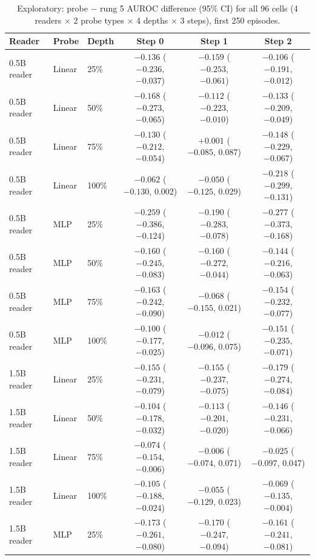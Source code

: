 \documentclass[11pt]{article}
\begin{document}
\begin{table}[h]
\centering\scriptsize
\setlength{\tabcolsep}{3pt}
\caption{Exploratory: probe $-$ rung 5 AUROC difference (95\% CI) for all 96 cells (4 readers $\times$ 2 probe types $\times$ 4 depths $\times$ 3 steps), first 250 episodes.}\label{tab:a9}
\begin{tabular}{@{}lllccc@{}}
\toprule
Reader & Probe & Depth & Step 0 & Step 1 & Step 2 \\
\midrule
0.5B reader & Linear & 25\% & $-0.136$ ($-0.236$, $-0.037$) & $-0.159$ ($-0.253$, $-0.061$) & $-0.106$ ($-0.191$, $-0.012$) \\
0.5B reader & Linear & 50\% & $-0.168$ ($-0.273$, $-0.065$) & $-0.112$ ($-0.223$, $-0.010$) & $-0.133$ ($-0.209$, $-0.049$) \\
0.5B reader & Linear & 75\% & $-0.130$ ($-0.212$, $-0.054$) & $+0.001$ ($-0.085$, 0.087) & $-0.148$ ($-0.229$, $-0.067$) \\
0.5B reader & Linear & 100\% & $-0.062$ ($-0.130$, 0.002) & $-0.050$ ($-0.125$, 0.029) & $-0.218$ ($-0.299$, $-0.131$) \\
0.5B reader & MLP & 25\% & $-0.259$ ($-0.386$, $-0.124$) & $-0.190$ ($-0.283$, $-0.078$) & $-0.277$ ($-0.373$, $-0.168$) \\
0.5B reader & MLP & 50\% & $-0.160$ ($-0.245$, $-0.083$) & $-0.160$ ($-0.272$, $-0.044$) & $-0.144$ ($-0.216$, $-0.063$) \\
0.5B reader & MLP & 75\% & $-0.163$ ($-0.242$, $-0.090$) & $-0.068$ ($-0.155$, 0.021) & $-0.154$ ($-0.232$, $-0.077$) \\
0.5B reader & MLP & 100\% & $-0.100$ ($-0.177$, $-0.025$) & $-0.012$ ($-0.096$, 0.075) & $-0.151$ ($-0.235$, $-0.071$) \\
1.5B reader & Linear & 25\% & $-0.155$ ($-0.231$, $-0.079$) & $-0.155$ ($-0.237$, $-0.075$) & $-0.179$ ($-0.274$, $-0.084$) \\
1.5B reader & Linear & 50\% & $-0.104$ ($-0.178$, $-0.032$) & $-0.113$ ($-0.201$, $-0.020$) & $-0.146$ ($-0.231$, $-0.066$) \\
1.5B reader & Linear & 75\% & $-0.074$ ($-0.154$, $-0.006$) & $-0.006$ ($-0.074$, 0.071) & $-0.025$ ($-0.097$, 0.047) \\
1.5B reader & Linear & 100\% & $-0.105$ ($-0.188$, $-0.024$) & $-0.055$ ($-0.129$, 0.023) & $-0.069$ ($-0.135$, $-0.004$) \\
1.5B reader & MLP & 25\% & $-0.173$ ($-0.261$, $-0.080$) & $-0.170$ ($-0.247$, $-0.094$) & $-0.161$ ($-0.241$, $-0.081$) \\

\end{tabular}
\end{table}
\end{document}
